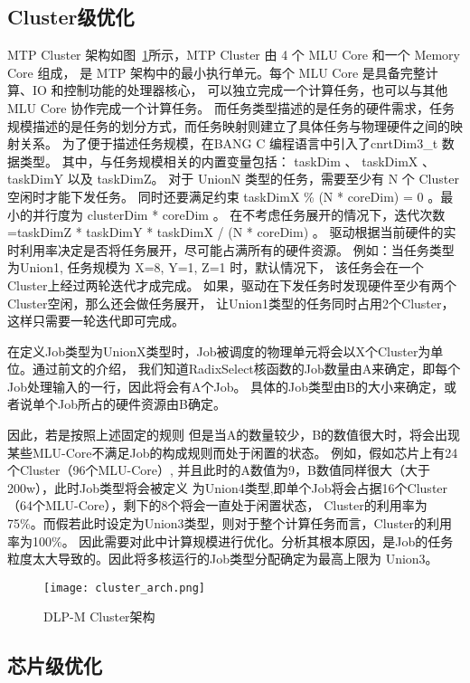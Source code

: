 \subsection{Cluster级优化}
MTP Cluster 架构如图~\ref{fig:cluster_arch}所示，MTP Cluster 由 4 个 MLU Core 和一个 Memory Core 组成，
是 MTP 架构中的最小执行单元。每个 MLU Core 是具备完整计算、IO 和控制功能的处理器核心，
可以独立完成一个计算任务，也可以与其他 MLU Core 协作完成一个计算任务。
而任务类型描述的是任务的硬件需求，任务规模描述的是任务的划分方式，而任务映射则建立了具体任务与物理硬件之间的映射关系。
为了便于描述任务规模，在BANG C 编程语言中引入了cnrtDim3\_t 数据类型。
其中，与任务规模相关的内置变量包括： taskDim 、 taskDimX 、 taskDimY 以及 taskDimZ。
对于 UnionN 类型的任务，需要至少有 N 个 Cluster 空闲时才能下发任务。
同时还要满足约束 taskDimX \% (N * coreDim) = 0 。最小的并行度为 clusterDim * coreDim 。
在不考虑任务展开的情况下，迭代次数=taskDimZ * taskDimY * taskDimX / (N * coreDim) 。
驱动根据当前硬件的实时利用率决定是否将任务展开，尽可能占满所有的硬件资源。
例如：当任务类型为Union1, 任务规模为 {X=8, Y=1, Z=1} 时，默认情况下，
该任务会在一个Cluster上经过两轮迭代才成完成。
如果，驱动在下发任务时发现硬件至少有两个Cluster空闲，那么还会做任务展开，
让Union1类型的任务同时占用2个Cluster，这样只需要一轮迭代即可完成。

在定义Job类型为UnionX类型时，Job被调度的物理单元将会以X个Cluster为单位。通过前文的介绍，
我们知道RadixSelect核函数的Job数量由A来确定，即每个Job处理输入的一行，因此将会有A个Job。
具体的Job类型由B的大小来确定，或者说单个Job所占的硬件资源由B确定。

因此，若是按照上述固定的规则
但是当A的数量较少，B的数值很大时，将会出现某些MLU-Core不满足Job的构成规则而处于闲置的状态。
例如，假如芯片上有24个Cluster（96个MLU-Core）, 并且此时的A数值为9，B数值同样很大（大于200w），此时Job类型将会被定义
为Union4类型,即单个Job将会占据16个Cluster（64个MLU-Core），剩下的8个将会一直处于闲置状态，
Cluster的利用率为75\%。而假若此时设定为Union3类型，则对于整个计算任务而言，Cluster的利用率为100\%。
因此需要对此中计算规模进行优化。分析其根本原因，是Job的任务粒度太大导致的。因此将多核运行的Job类型分配确定为最高上限为
Union3。

\begin{figure}[ht]
    \centering
    \texttt{[image: cluster\_arch.png]}
    \caption{DLP-M Cluster架构}
    \label{fig:cluster_arch}
\end{figure}


\subsection{芯片级优化}

